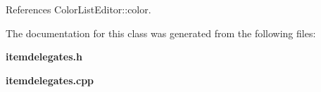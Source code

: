 References Color\+List\+Editor\+::color.



The documentation for this class was generated from the following files\+:\begin{DoxyCompactItemize}
\item 
{\bf itemdelegates.\+h}\item 
{\bf itemdelegates.\+cpp}\end{DoxyCompactItemize}
